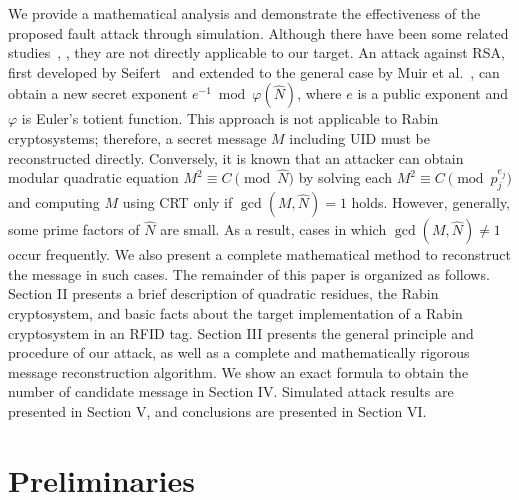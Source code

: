 \documentclass{article}
\begin{document}
We provide a mathematical analysis and 
demonstrate the effectiveness of the proposed fault attack through simulation.
Although there have been some related studies~\cite{Seifert}, \cite{Muir}, they 
are not directly applicable to our target.
An attack against RSA, first developed by Seifert~\cite{Seifert} and
extended to the general case by Muir et al.~\cite{Muir}, can obtain a new secret
exponent $e^{-1}\bmod \varphi(\hat{N})$, where $e$ is a public exponent and 
$\varphi$ is Euler's totient function. 
This approach is not applicable to Rabin cryptosystems; 
therefore, a secret message $M$ including UID must be reconstructed directly.
Conversely, it is known that an attacker can obtain modular quadratic 
equation $M^2 \equiv C\pmod{\hat{N}}$ by solving each $M^2\equiv C\pmod{p_j^{e_j}}$ and
computing $M$ using CRT only if $\gcd(M,\hat{N})=1$ holds.
However, generally, 
some prime factors of $\hat{N}$ are small. 
As a result, cases in which $\gcd(M,\hat{N})\ne 1$ occur frequently. We also present a complete mathematical method to reconstruct the message in such cases. 
\medskip
The remainder of this paper is organized as follows. 
Section II presents a brief description of quadratic residues, 
the Rabin cryptosystem, and basic facts about the target implementation of a Rabin cryptosystem 
in an RFID tag.
Section III presents the general principle and procedure of our attack, 
as well as a complete and mathematically rigorous message reconstruction algorithm.
We show an exact formula to obtain the number of candidate message in Section IV. 
Simulated attack results are presented in Section V, and conclusions are presented in Section VI. 
\section{Preliminaries}
\end{document}
